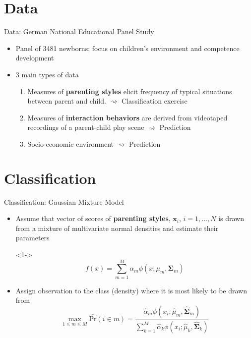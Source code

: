 \documentclass[notes, 12.5pt, aspectratio=169]{beamer}
\begin{document}
\section{Data}
\begin{frame}[label=data]{Data: German National Educational Panel Study}
	\begin{itemize}[(I)]
		\item<1-> Panel of 3481 newborns; focus on children's environment and competence development
		\vspace{10pt}
		\item<2-> 3 main types of data
		\begin{enumerate}
			\item<2-> Measures of \textbf{parenting styles} elicit frequency of typical situations between parent and child. $\rightsquigarrow$ Classification exercise
			\item<2-> Measures of \textbf{interaction behaviors} are derived from videotaped recordings of a parent-child play scene $\rightsquigarrow$ Prediction 
			\item<2-> Socio-economic environment $\rightsquigarrow$ Prediction
		\end{enumerate}
	\end{itemize}
\hyperlink{appendix_2}{}
\end{frame}


\section{Classification}
\begin{frame}{Classification: Gaussian Mixture Model}
	\begin{itemize}[(I)]
		\item<1-> Assume that vector of scores of \textbf{parenting styles}, $\bm{x}_i$, $i=1,\ldots,N$ is drawn from a mixture of multivariate normal densities and estimate their parameters
		\item[]<1-> \begin{equation*} f(x) = \sum_{m=1}^{M} \alpha_m \phi(x; \mu_m, \bm{\Sigma}_m) \end{equation*}
		\item<2-> Assign observation to the class (density) where it is most likely to be drawn from \begin{equation*}
			\max_{1 \leqslant m \leqslant M} \widehat{\text{Pr}}(i \in m) = \frac{\widehat{\alpha}_m \phi(x_i; \widehat{\mu}_m, \widehat{\bm{\Sigma}}_m)}{\sum_{k=1}^{M} \widehat{\alpha}_k \phi(x_i; \widehat{\mu}_k, \widehat{\bm{\Sigma}}_k)}
		\end{equation*}
	\end{itemize}
\end{frame}
\end{document}
